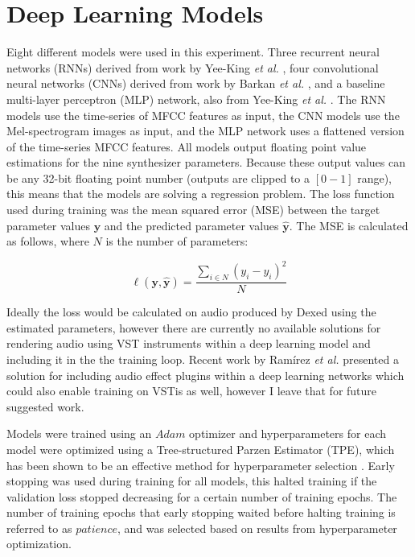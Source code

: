 \section{Deep Learning Models}
Eight different models were used in this experiment. Three recurrent neural networks (RNNs) derived from work by Yee-King \textit{et al.} \cite{yee2018automatic}, four convolutional neural networks (CNNs) derived from work by Barkan \textit{et al.} \cite{barkan2019inversynth}, and a baseline multi-layer perceptron (MLP) network, also from Yee-King \textit{et al.} \cite{yee2018automatic}. The RNN models use the time-series of MFCC features as input, the CNN models use the Mel-spectrogram images as input, and the MLP network uses a flattened version of the time-series MFCC features. All models output floating point value estimations for the nine synthesizer parameters. Because these output values can be any 32-bit floating point number (outputs are clipped to a $[0-1]$ range), this means that the models are solving a regression problem. The loss function used during training was the mean squared error (MSE) between the target parameter values $\textbf{y}$ and the predicted parameter values $\hat{\textbf{y}}$. The MSE is calculated as follows, where $N$ is the number of parameters:

\begin{equation}\label{equation:mse}
    \ell(\textbf{y}, \hat{\textbf{y}}) = \frac{\sum_{i \in N}{(y_i - \hat{y_i})^2}}{N}
\end{equation}

Ideally the loss would be calculated on audio produced by Dexed using the estimated parameters, however there are currently no available solutions for rendering audio using VST instruments within a deep learning model and including it in the the training loop. Recent work by Ramírez \textit{et al.} presented a solution for including audio effect plugins within a deep learning networks \cite{ramirez2021differentiable} which could also enable training on VSTis as well, however I leave that for future suggested work. 

Models were trained using an $Adam$ optimizer \cite{kingma2014adam} and hyperparameters for each model were optimized using a  Tree-structured Parzen Estimator (TPE), which has been shown to be an effective method for hyperparameter selection \cite{bergstra2011algorithms}. Early stopping was used during training for all models, this halted training if the validation loss stopped decreasing for a certain number of training epochs. The number of training epochs that early stopping waited before halting training is referred to as $patience$, and was selected based on results from hyperparameter optimization.

